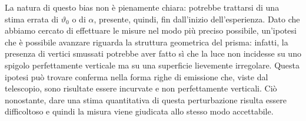 La natura di questo bias non è pienamente chiara: potrebbe trattarsi di una stima errata di $\vartheta_0$ o di $\alpha$, presente, quindi, fin dall’inizio dell’esperienza. Dato che abbiamo cercato di effettuare le misure nel modo più preciso possibile, un’ipotesi che è possibile avanzare riguarda la struttura geometrica del prisma: infatti, la presenza di vertici smussati potrebbe aver fatto sì che la luce non incidesse su uno spigolo perfettamente verticale ma su una superficie lievemente irregolare.
Questa ipotesi può trovare conferma nella forma righe di emissione che, viste dal telescopio, sono risultate essere incurvate e non perfettamente verticali. Ciò nonostante, dare una stima quantitativa di questa perturbazione risulta essere difficoltoso e quindi la misura viene giudicata allo stesso modo accettabile.
